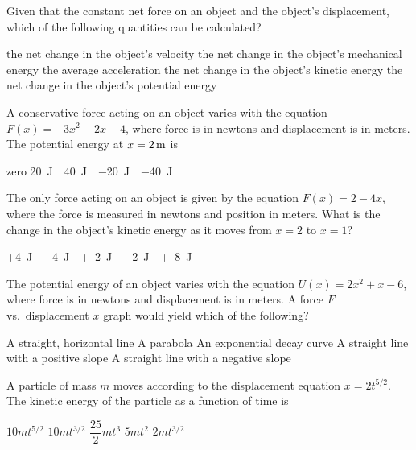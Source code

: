 \documentclass{../../oss-apphys-exam}
\begin{document}
\begin{multicols*}{2}
\begin{questions}
    \question Given that the constant net force on an object and the object's 
    displacement, which of the following quantities can be calculated?
    \begin{choices}
      \choice the net change in the object's velocity
      \choice the net change in the object's mechanical energy
      \choice the average acceleration
      \choice the net change in the object's kinetic energy
      \choice the net change in the object's potential energy
    \end{choices}
    \columnbreak
    
    \question A conservative force acting on an object varies with the
    equation $F(x)=-3x^2-2x-4$, where force is in newtons and displacement is
    in meters. The potential energy at $x=\SI2\metre$ is
    \begin{choices}
      \choice zero
      \choice\SI{20}\joule
      \choice\SI{40}\joule
      \choice\SI{-20}\joule
      \choice\SI{-40}\joule
    \end{choices}
    
    \question The only force acting on an object is given by the equation
    $F(x)=2-4x$, where the force is measured in newtons and position in meters.
    What is the change in the object's kinetic energy as it moves from $x=2$ to
    $x=1$?
    \begin{choices}
      \choice +\SI{4}\joule
      \choice \SI{-4}\joule
      \choice +\SI{2}\joule
      \choice \SI{-2}\joule
      \choice +\SI{8}\joule
    \end{choices}
    
    \question The potential energy of an object varies with the equation
    $U(x)=2x^2+x-6$, where force is in newtons and displacement is in meters. A
    force $F$ vs.\ displacement $x$ graph would yield which of the following?
    \begin{choices}
      \choice A straight, horizontal line
      \choice A parabola
      \choice An exponential decay curve
      \choice A straight line with a positive slope
      \choice A straight line with a negative slope
    \end{choices}
    \vspace{.7in}
    
    \question A particle of mass $m$ moves according to the displacement
    equation $x=2t^{5/2}$. The kinetic energy of the particle as a function of
    time is
    \begin{choices}
      \choice $10mt^{5/2}$
      \choice $10mt^{3/2}$
      \choice $\dfrac{25}2mt^3$
      \choice $5mt^2$
      \choice $2mt^{3/2}$
    \end{choices}
    \columnbreak
    

\end{questions}
\end{multicols*}
\end{document}
